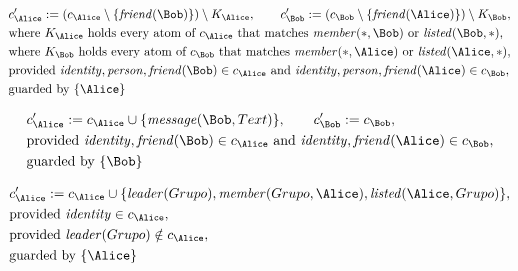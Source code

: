\begin{align*}
&
c'_
{
\Alice
}
 := 
(c_
{
\Alice
}
 \setminus 
\{
\mathit{\detokenize{
friend
}}
(
\Bob
)
\}
) \setminus K_
{
\Alice
}
, \qquad 
c'_
{
\Bob
}
 := 
(c_
{
\Bob
}
 \setminus 
\{
\mathit{\detokenize{
friend
}}
(
\Alice
)
\}
) \setminus K_
{
\Bob
}
,\\
&
\text{where } K_
{
\Alice
}
 \text{ holds every atom of } c_
{
\Alice
}
 \text{ that matches } 
\mathit{\detokenize{
member
}}
(
\ast
,
\Bob
)
 \text{ or } 
\mathit{\detokenize{
listed
}}
(
\Bob
,
\ast
)
,\\
&
\text{where } K_
{
\Bob
}
 \text{ holds every atom of } c_
{
\Bob
}
 \text{ that matches } 
\mathit{\detokenize{
member
}}
(
\ast
,
\Alice
)
 \text{ or } 
\mathit{\detokenize{
listed
}}
(
\Alice
,
\ast
)
,\\
&
\text{provided } 
\mathit{\detokenize{
identity
}}
,
\mathit{\detokenize{
person
}}
,
\mathit{\detokenize{
friend
}}
(
\Bob
)
 \in c_
{
\Alice
}
 \text{ and } 
\mathit{\detokenize{
identity
}}
,
\mathit{\detokenize{
person
}}
,
\mathit{\detokenize{
friend
}}
(
\Alice
)
 \in c_
{
\Bob
}
,\\
&
\text{guarded by } \{
\Alice
\}
\end{align*}

\begin{align*}
&
c'_
{
\Alice
}
 := 
c_
{
\Alice
}
 \cup 
\{
\mathit{\detokenize{
message
}}
(
\Bob
,
Text
)
\}
, \qquad 
c'_
{
\Bob
}
 := 
c_
{
\Bob
}
,\\
&
\text{provided } 
\mathit{\detokenize{
identity
}}
,
\mathit{\detokenize{
friend
}}
(
\Bob
)
 \in c_
{
\Alice
}
 \text{ and } 
\mathit{\detokenize{
identity
}}
,
\mathit{\detokenize{
friend
}}
(
\Alice
)
 \in c_
{
\Bob
}
,\\
&
\text{guarded by } \{
\Bob
\}
\end{align*}

\begin{align*}
&
c'_
{
\Alice
}
 := 
c_
{
\Alice
}
 \cup 
\{
\mathit{\detokenize{
leader
}}
(
Grupo
)
,
\mathit{\detokenize{
member
}}
(
Grupo
,
\Alice
)
,
\mathit{\detokenize{
listed
}}
(
\Alice
,
Grupo
)
\}
,\\
&
\text{provided } 
\mathit{\detokenize{
identity
}}
 \in c_
{
\Alice
}
,\\
&
\text{provided } 
\mathit{\detokenize{
leader
}}
(
Grupo
)
 \notin c_
{
\Alice
}
,\\
&
\text{guarded by } \{
\Alice
\}
\end{align*}


